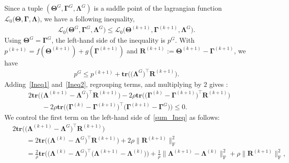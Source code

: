 \documentclass[alpha-refs]{wiley-article}
\begin{document}
Since a tuple $(\boldsymbol{\Theta}^{G}, \boldsymbol{\Gamma}^{G}, \boldsymbol{\Lambda}^{G})$ is a saddle point of the lagrangian function $\mathcal{L}_{0}\big(\boldsymbol{\Theta},\boldsymbol{\Gamma},\boldsymbol{\Lambda} \big)$, we have a following inequality,
\begin{align*}
    \mathcal{L}_{0}\big(\boldsymbol{\Theta}^{G},\boldsymbol{\Gamma}^{G},\boldsymbol{\Lambda}^{G} \big) \leq  \mathcal{L}_{0}\big(\boldsymbol{\Theta}^{(k+1)},\boldsymbol{\Gamma}^{(k+1)},\boldsymbol{\Lambda}^{G} \big).
\end{align*}
Using $\boldsymbol{\Theta}^{G} = \boldsymbol{\Gamma}^{G}$, the left-hand side of the inequality is $p^{G}$.
With $p^{(k+1)}=f(\boldsymbol{\Theta}^{(k+1)})+g(\boldsymbol{\Gamma}^{(k+1)})$ and  $\boldsymbol{R}^{(k+1)}:= \boldsymbol{\Theta}^{(k+1)}-\boldsymbol{\Gamma}^{(k+1)}$, we have
\begin{align} \label{Ineq2}
    p^{G} \leq p^{(k+1)} + \textbf{tr}\big(\big( \boldsymbol{\Lambda}^{G}\big)^{\top}\boldsymbol{R}^{(k+1)} \big).
\end{align}
Adding~\eqref{Ineq1} and~\eqref{Ineq2}, regrouping terms, and multiplying by $2$ gives :
\begin{align} \label{sum_Ineq}
    &2\textbf{tr}\big( \big( \boldsymbol{\Lambda}^{(k+1)} - \boldsymbol{\Lambda}^{G} \big)^{\top}\boldsymbol{R}^{(k+1)} \big)
    -2 \rho \textbf{tr}\big( \big( \boldsymbol{\Gamma}^{(k)} - \boldsymbol{\Gamma}^{(k+1)} \big)^{\top}\boldsymbol{R}^{(k+1)} \big) \nonumber \\
    &\qquad -2\rho \textbf{tr}\big( \big( \boldsymbol{\Gamma}^{(k)} - \boldsymbol{\Gamma}^{(k+1)} \big)^{\top}\big(
    \boldsymbol{\Gamma}^{(k+1)}-\boldsymbol{\Gamma}^{G}\big) \big) \leq 0.
\end{align}
We control the first term on the left-hand side of~\eqref{sum_Ineq} as follows:
\begin{align}
    &2\textbf{tr}\big( \big( \boldsymbol{\Lambda}^{(k+1)} - \boldsymbol{\Lambda}^{G} \big)^{\top}\boldsymbol{R}^{(k+1)} \big) \nonumber \\
    &\qquad= 2\textbf{tr}\big( \big( \boldsymbol{\Lambda}^{(k)} - \boldsymbol{\Lambda}^{G} \big)^{\top}\boldsymbol{R}^{(k+1)} \big)
    + 2\rho \| \boldsymbol{R}^{(k+1)} \|_{\text{F}}^{2} \nonumber \\
    &\qquad = \frac{2}{\rho}\textbf{tr}\big( \big( \boldsymbol{\Lambda}^{(k)} - \boldsymbol{\Lambda}^{G} \big)^{\top}\big( \boldsymbol{\Lambda}^{(k+1)} - \boldsymbol{\Lambda}^{(k)} \big) \big) + \frac{1}{\rho} \| \boldsymbol{\Lambda}^{(k+1)} - \boldsymbol{\Lambda}^{(k)} \|_{\text{F}}^{2}
    + \rho \| \boldsymbol{R}^{(k+1)} \|_{\text{F}}^{2}, \label{firsterm}
\end{align}
\end{document}
